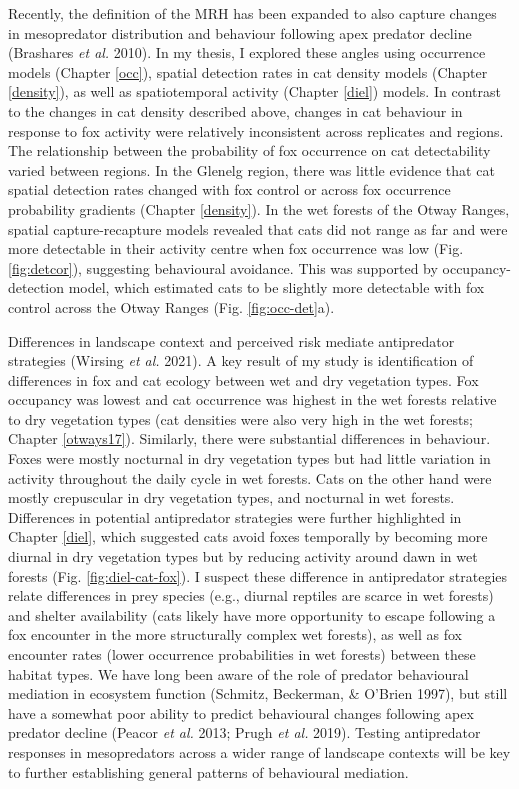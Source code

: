\documentclass[11pt,a4paper,titlepage,twoside,openright]{style/unimelbthesis}
\begin{document}
\begin{mainmatter}
Recently, the definition of the MRH has been expanded to also capture changes in mesopredator distribution and behaviour following apex predator decline (Brashares \emph{et al.} 2010). In my thesis, I explored these angles using occurrence models (Chapter \ref{occ}), spatial detection rates in cat density models (Chapter \ref{density}), as well as spatiotemporal activity (Chapter \ref{diel}) models. In contrast to the changes in cat density described above, changes in cat behaviour in response to fox activity were relatively inconsistent across replicates and regions.
The relationship between the probability of fox occurrence on cat detectability varied between regions. In the Glenelg region, there was little evidence that cat spatial detection rates changed with fox control or across fox occurrence probability gradients (Chapter \ref{density}). In the wet forests of the Otway Ranges, spatial capture-recapture models revealed that cats did not range as far and were more detectable in their activity centre when fox occurrence was low (Fig. \ref{fig:detcor}), suggesting behavioural avoidance. This was supported by occupancy-detection model, which estimated cats to be slightly more detectable with fox control across the Otway Ranges (Fig. \ref{fig:occ-det}a).

Differences in landscape context and perceived risk mediate antipredator strategies (Wirsing \emph{et al.} 2021). A key result of my study is identification of differences in fox and cat ecology between wet and dry vegetation types. Fox occupancy was lowest and cat occurrence was highest in the wet forests relative to dry vegetation types (cat densities were also very high in the wet forests; Chapter \ref{otways17}). Similarly, there were substantial differences in behaviour. Foxes were mostly nocturnal in dry vegetation types but had little variation in activity throughout the daily cycle in wet forests. Cats on the other hand were mostly crepuscular in dry vegetation types, and nocturnal in wet forests. Differences in potential antipredator strategies were further highlighted in Chapter \ref{diel}, which suggested cats avoid foxes temporally by becoming more diurnal in dry vegetation types but by reducing activity around dawn in wet forests (Fig. \ref{fig:diel-cat-fox}). I suspect these difference in antipredator strategies relate differences in prey species (e.g., diurnal reptiles are scarce in wet forests) and shelter availability (cats likely have more opportunity to escape following a fox encounter in the more structurally complex wet forests), as well as fox encounter rates (lower occurrence probabilities in wet forests) between these habitat types. We have long been aware of the role of predator behavioural mediation in ecosystem function (Schmitz, Beckerman, \& O'Brien 1997), but still have a somewhat poor ability to predict behavioural changes following apex predator decline (Peacor \emph{et al.} 2013; Prugh \emph{et al.} 2019). Testing antipredator responses in mesopredators across a wider range of landscape contexts will be key to further establishing general patterns of behavioural mediation.


\end{mainmatter}
\end{document}
